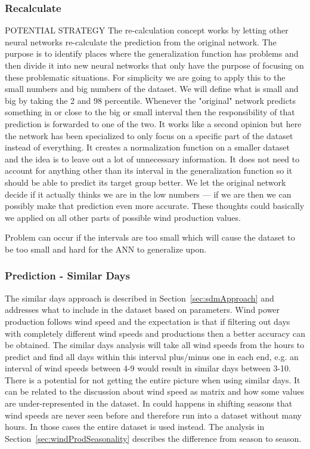 \subsubsection{Recalculate}
POTENTIAL STRATEGY
The re-calculation concept works by letting other neural networks re-calculate the prediction from the original network. The purpose is to identify places where the generalization function has problems and then divide it into new neural networks that only have the purpose of focusing on these problematic situations. For simplicity we are going to apply this to the small numbers and big numbers of the dataset. We will define what is small and big by taking the 2 and 98 percentile. Whenever the "original" network predicts something in or close to the big or small interval then the responsibility of that prediction is forwarded to one of the two. It works like a second opinion but here the network has been specialized to only focus on a specific part of the dataset instead of everything. It creates a normalization function on a smaller dataset and the idea is to leave out a lot of unnecessary information. It does not need to account for anything other than its interval in the generalization function so it should be able to predict its target group better. We let the original network decide if it actually thinks we are in the low numbers --- if we are then we can possibly make that prediction even more accurate. These thoughts could basically we applied on all other parts of possible wind production values. 

Problem can occur if the intervals are too small which will cause the dataset to be too small and hard for the ANN to generalize upon.

\subsubsection{Prediction - Similar Days}
The similar days approach is described in Section~\ref{sec:sdmApproach} and addresses what to include in the dataset based on parameters. Wind power production follows wind speed and the expectation is that if filtering out days with completely different wind speeds and productions then a better accuracy can be obtained. The similar days analysis will take all wind speeds from the hours to predict and find all days within this interval plus/minus one in each end, e.g. an interval of wind speeds between 4-9 would result in similar days between 3-10. There is a potential for not getting the entire picture when using similar days. It can be related to the discussion about wind speed as matrix and how some values are under-represented in the dataset. In could happens in shifting seasons that wind speeds are never seen before and therefore run into a dataset without many hours. In those cases the entire dataset is used instead. The analysis in Section~\ref{sec:windProdSeasonality} describes the difference from season to season.

